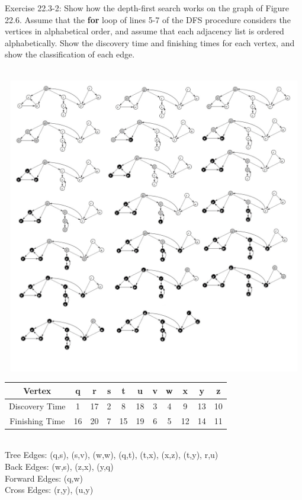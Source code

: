 \documentclass[addpoints,11pt]{exam}
\begin{document}
\begin{questions}
\question[5]
Exercise 22.3-2:  Show how the depth-first search works on the graph of Figure 22.6.  Assume that the \textbf{for} loop of lines 5-7 of the DFS procedure considers the vertices in alphabetical order, and assume that each adjacency list is ordered alphabetically.  Show the discovery time and finishing times for each vertex, and show the classification of each edge.
\begin{solutionorbox} \\ 
	\includegraphics[width=15cm,height=13cm]{dfs.jpg} \\
	\begin{tabular}{c | c | c | c | c | c | c | c | c | c | c}
	     Vertex & q & r & s & t & u & v & w & x & y & z\\
	     \hline
	     Discovery Time & 1 & 17 & 2 & 8 & 18 & 3 & 4 & 9 & 13 & 10\\
	     \hline
	     Finishing Time & 16 & 20 & 7 & 15 & 19 & 6 & 5 & 12 & 14 & 11\\
	\end{tabular} \\ 
	Tree Edges: (q,s), (s,v), (w,w), (q,t), (t,x), (x,z), (t,y), r,u)\\
	Back Edges: (w,s), (z,x), (y,q)\\
	Forward Edges: (q,w)\\
	Cross Edges: (r,y), (u,y)
\end{solutionorbox}


\end{questions}
\end{document}
